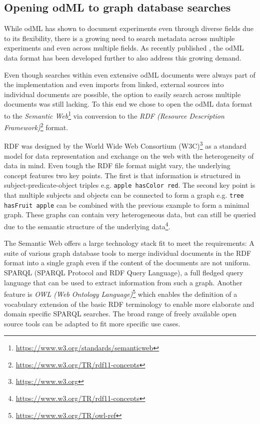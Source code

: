 \documentclass{article}
\begin{document}
\subsection{Opening odML to graph database searches} \label{sec:why_rdf}

While odML has shown to document experiments even through diverse fields due to its flexibility, there is a growing need to search metadata across multiple experiments and even across multiple fields. As recently published \cite{Sprenger_2019}, the odML data format has been developed further to also address this growing demand.

Even though searches within even extensive odML documents were always part of the implementation and even imports from linked, external sources into individual documents are possible, the option to easily search across multiple documents was still lacking. To this end we chose to open the odML data format to the \textit{Semantic Web}\footnote{\url{https://www.w3.org/standards/semanticweb}} via conversion to the \textit{RDF (Resource Description Framework)}\footnote{\url{https://www.w3.org/TR/rdf11-concepts}} format.

RDF was designed by the World Wide Web Consortium (W3C)\footnote{\url{https://www.w3.org}} as a standard model for data representation and exchange on the web with the heterogeneity of data in mind. Even tough the RDF file format might vary, the underlying concept features two key points. The first is that information is structured in subject-predicate-object triples e.g. \texttt{apple hasColor red}. The second key point is that multiple subjects and objects can be connected to form a graph e.g. \texttt{tree hasFruit apple} can be combined with the previous example to form a minimal graph. These graphs can contain very heterogeneous data, but can still be queried due to the semantic structure of the underlying data\footnote{\url{https://www.w3.org/TR/rdf11-concepts}}.

The Semantic Web offers a large technology stack fit to meet the requirements: A suite of various graph database tools to merge individual documents in the RDF format into a single graph even if the content of the documents are not uniform. SPARQL (SPARQL Protocol and RDF Query Language), a full fledged query language that can be used to extract information from such a graph. Another feature is \textit{OWL (Web Ontology Language)}\footnote{\url{https://www.w3.org/TR/owl-ref}} which enables the definition of a vocabulary extension of the basic RDF terminology to enable more elaborate and domain specific SPARQL searches. The broad range of freely available open source tools can be adapted to fit more specific use cases.
\end{document}
